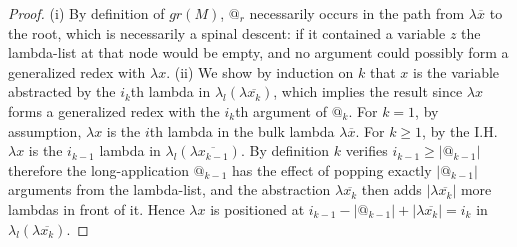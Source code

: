 \documentclass[xchauthor,chkrefs,GCNS,amsmath,amsthm,rotating,leaveRGB]{tcsg}
\theoremstyle{plain}
\theoremstyle{definition}
\begin{document}
\begin{proof}
(i) By definition of $gr(M)$, $@_{r}$ necessarily occurs in the path from
$\lambda \overline{x}$ to the root, which is necessarily a spinal descent: if
it contained a variable $z$ the lambda-list at that node would be empty, and
no argument could possibly form a generalized redex with $\lambda x$. (ii) We
show by induction on $k$ that $x$ is the variable abstracted by the $i_{k}$th
lambda in $\lambda _{l}(\lambda \overline{x_{k}})$, which implies the result
since $\lambda x$ forms a generalized redex with the $i_{k}$th argument of
$@_{k}$. For $k=1$, by assumption, $\lambda x$ is the $i$th lambda in the
bulk lambda $\lambda \overline{x}$. For $k\geq 1$, by the I.H. $\lambda x$ is
the $i_{k-1}$ lambda in $\lambda _{l}(\lambda \overline{x_{k-1}})$. By
definition $k$ verifies $i_{k-1}\geq |@_{k-1}|$ therefore the
long-application $@_{k-1}$ has the effect of popping exactly $|@_{k-1}|$
arguments from the lambda-list, and the abstraction $\lambda
\overline{x_{k}}$ then adds $|\lambda \overline{x_{k}}|$ more lambdas in
front of it. Hence $\lambda x$ is positioned at $i_{k-1} - |@_{k-1}| +
|\lambda \overline{x_{k}}| = i_{k}$ in $\lambda _{l}(\lambda
\overline{x_{k}})$.
\end{proof}
%
\end{document}
